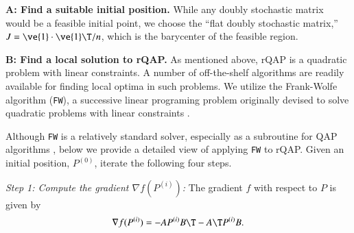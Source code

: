 \documentclass[preprint,11pt]{elsarticle}
\begin{document}
\textbf{A: Find a suitable initial position.}  While any doubly stochastic matrix would be a feasible initial point, we choose the 
``flat doubly  stochastic matrix,'' $J=\ve{1} \cdot \ve{1}\T/n$, which is the barycenter of the feasible region.


\textbf{B: Find a local solution to rQAP.} As mentioned above, rQAP is a quadratic problem with linear constraints.  A number of off-the-shelf algorithms are readily available for finding local optima in such problems.  We utilize the Frank-Wolfe algorithm (\texttt{FW}), a successive linear programing problem originally devised to solve quadratic problems with linear constraints \cite{Frank1956, Bradley1977}.

Although \texttt{FW} is a relatively standard solver, especially as a subroutine for QAP algorithms \cite{Anstreicher03}, below we provide a detailed view of applying \texttt{FW} to rQAP.
Given an initial position, $P^{(0)}$, iterate the following four steps.

\emph{Step 1: Compute the gradient $\nabla f(P^{(i)})$:}  The gradient $f$ with respect to $P$ is given by
\begin{align*} \label{eq:grad}
	\nabla f (P^{(i)}) = 
	  - A P^{(i)} B\T - A\T P^{(i)} B.
\end{align*}
\end{document}
